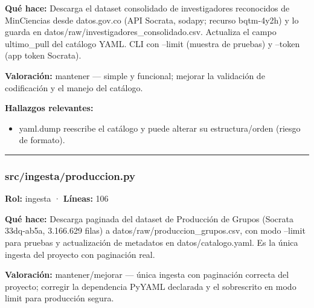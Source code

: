 \textbf{Qué hace:} Descarga el dataset consolidado de investigadores reconocidos de MinCiencias desde datos.gov.co (API Socrata, sodapy; recurso bqtm-4y2h) y lo guarda en datos/raw/investigadores\_consolidado.csv. Actualiza el campo ultimo\_pull del catálogo YAML. CLI con --limit (muestra de pruebas) y --token (app token Socrata).

\textbf{Valoración:} mantener --- simple y funcional; mejorar la validación de codificación y el manejo del catálogo.

\textbf{Hallazgos relevantes:}
\begin{itemize}
  \item yaml.dump reescribe el catálogo y puede alterar su estructura/orden (riesgo de formato).
\end{itemize}

\medskip
\hrule

\subsubsection{src/ingesta/produccion.py}
\textbf{Rol:} ingesta · \textbf{Líneas:} 106

\textbf{Qué hace:} Descarga paginada del dataset de Producción de Grupos (Socrata 33dq-ab5a, 3.166.629 filas) a datos/raw/produccion\_grupos.csv, con modo --limit para pruebas y actualización de metadatos en datos/catalogo.yaml. Es la única ingesta del proyecto con paginación real.

\textbf{Valoración:} mantener/mejorar --- única ingesta con paginación correcta del proyecto; corregir la dependencia PyYAML declarada y el sobrescrito en modo limit para producción segura.

